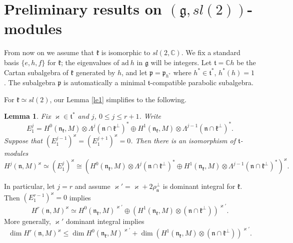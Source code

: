 \documentclass[11pt]{amsart}
\newcounter{theorem}
\newtheorem{lemma}[theo]{Lemma}
\newcommand {\CC} {\mathbb {C}}
\renewcommand{\tt}{\mathfrak{t}}
\newcommand{\kk}{\mathfrak{k}}
\newcommand{\nn}{\mathfrak{n}}
\newcommand{\pp}{\mathfrak{p}}
\renewcommand{\gg}{\mathfrak{g}}
\newcommand{\refle}[1]{Lemma \ref{#1}}
\newcommand{\ad}{\mathrm{ad~}}
\begin{document}
\section{Preliminary results on $(\gg,sl(2))$-modules}
From now on we assume that $\kk$ is isomorphic to $sl(2,\CC)$. We fix a standard basis $\{e,h,f\}$ for $\kk$; the eigenvalues of $\ad h$ in $\gg$ will be integers. Let $\tt=\CC h$ be the Cartan subalgebra of $\kk$ generated by $h$, and let $\pp=\pp_{h^*}$ where $h^*\in\tt^*$, $h^*(h)=1$. The subalgebra $\pp$  is automatically a minimal $\tt$-compatible parabolic subalgebra.

For $\kk\simeq sl(2)$, our \refle{le1} simplifies to the following.
\begin{lemma}\label{le2}
Fix $\varkappa\in\tt^*$ and $j$, $0\leq j\leq r+1$. Write $$E_1^j=H^0(\nn_\kk,M)\otimes \Lambda^j(\nn\cap\kk^\perp)^*\oplus H^1(\nn_\kk,M)\otimes \Lambda^{j-1}(\nn\cap\kk^\perp)^*.$$ Suppose that $(E_1^{j-1})^{\varkappa}=(E_1^{j+1})^{\varkappa}=0$. Then there is an isomorphism of $\tt$-modules $$H^j(\nn,M)^\varkappa\simeq (E_1^{j})^{\varkappa}\cong (H^0(\nn_\kk,M)\otimes \Lambda^j(\nn\cap\kk^\perp)^*\oplus H^1(\nn_\kk,M)\otimes \Lambda^{j-1}(\nn\cap\kk^\perp)^*)^{\varkappa}.$$
\end{lemma}

In particular, let $j=r$ and assume $\varkappa '=\varkappa+2\rho_\nn^\perp$ is dominant integral for $\kk$. Then $(E_1^{r-1})^{\varkappa}=0$ implies 
\begin{equation}\label{eqn5}
H^r(\nn,M)^\varkappa\simeq H^0(\nn_\kk,M)^{\varkappa '}\oplus \left(H^1(\nn_\kk,M)\otimes (\nn\cap\kk^\perp)\right)^{\varkappa '}.
\end{equation}
More generally, $\varkappa '$ dominant integral implies 
\begin{equation}
\dim H^r(\nn,M)^\varkappa\leq \dim H^0(\nn_\kk,M)^{\varkappa '}+\dim \left( H^1(\nn_\kk,M)\otimes (\nn\cap\kk^\perp)\right)^{\varkappa '}. 
\end{equation}  
\end{document}
